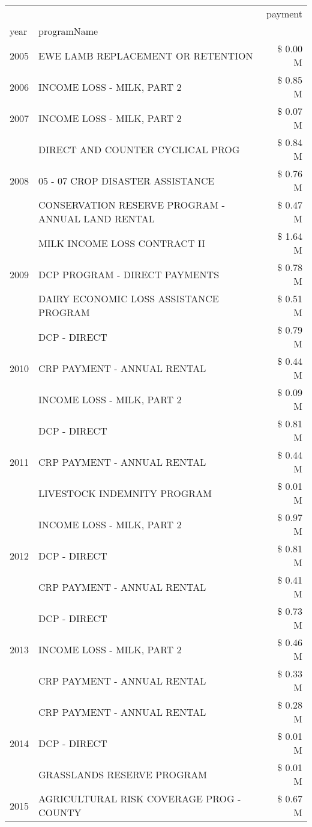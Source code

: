 \begin{tabular}{llr}
\toprule
 &  & payment \\
year & programName &  \\
\midrule
2005 & EWE LAMB REPLACEMENT OR RETENTION & \$ 0.00 M \\
\cline{1-3}
2006 & INCOME LOSS - MILK, PART 2 & \$ 0.85 M \\
\cline{1-3}
2007 & INCOME LOSS - MILK, PART 2 & \$ 0.07 M \\
\cline{1-3}
\multirow[t]{3}{*}{2008} & DIRECT AND COUNTER CYCLICAL PROG & \$ 0.84 M \\
 & 05 - 07 CROP DISASTER ASSISTANCE & \$ 0.76 M \\
 & CONSERVATION RESERVE PROGRAM - ANNUAL LAND RENTAL & \$ 0.47 M \\
\cline{1-3}
\multirow[t]{3}{*}{2009} & MILK INCOME LOSS CONTRACT II & \$ 1.64 M \\
 & DCP PROGRAM - DIRECT PAYMENTS & \$ 0.78 M \\
 & DAIRY ECONOMIC LOSS ASSISTANCE PROGRAM & \$ 0.51 M \\
\cline{1-3}
\multirow[t]{3}{*}{2010} & DCP - DIRECT & \$ 0.79 M \\
 & CRP PAYMENT - ANNUAL RENTAL & \$ 0.44 M \\
 & INCOME LOSS - MILK, PART 2 & \$ 0.09 M \\
\cline{1-3}
\multirow[t]{3}{*}{2011} & DCP - DIRECT & \$ 0.81 M \\
 & CRP PAYMENT - ANNUAL RENTAL & \$ 0.44 M \\
 & LIVESTOCK INDEMNITY PROGRAM & \$ 0.01 M \\
\cline{1-3}
\multirow[t]{3}{*}{2012} & INCOME LOSS - MILK, PART 2 & \$ 0.97 M \\
 & DCP - DIRECT & \$ 0.81 M \\
 & CRP PAYMENT - ANNUAL RENTAL & \$ 0.41 M \\
\cline{1-3}
\multirow[t]{3}{*}{2013} & DCP - DIRECT & \$ 0.73 M \\
 & INCOME LOSS - MILK, PART 2 & \$ 0.46 M \\
 & CRP PAYMENT - ANNUAL RENTAL & \$ 0.33 M \\
\cline{1-3}
\multirow[t]{3}{*}{2014} & CRP PAYMENT - ANNUAL RENTAL & \$ 0.28 M \\
 & DCP - DIRECT & \$ 0.01 M \\
 & GRASSLANDS RESERVE PROGRAM & \$ 0.01 M \\
\cline{1-3}
\multirow[t]{3}{*}{2015} & AGRICULTURAL RISK COVERAGE PROG - COUNTY & \$ 0.67 M \\

\end{tabular}

